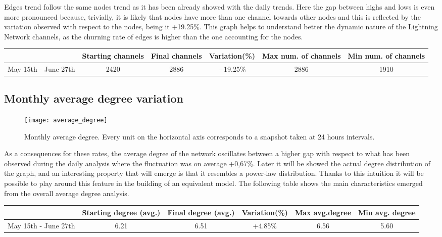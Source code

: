 	Edges trend follow the same nodes trend as it has been already showed with the daily trends. Here the gap between highs and lows is even more pronounced because, trivially, it is likely that nodes have more than one channel towards other nodes and this is reflected by the variation observed with respect to the nodes, being it +19.25\%. This graph helps to understand better the dynamic nature of the Lightning Network channels, as the churning rate of edges is higher than the one accounting for the nodes. 
	
	\begin{center}
		\begin{tabulary}{\linewidth}{| L | C | C | C | C | C |}
			\hline	
			& Starting channels & Final channels  & Variation(\%) & Max num. of channels & Min num. of channels \\ \hline
			May 15th - June 27th & 2420 & 2886 & +19.25\% & 2886 & 1910 \\ \hline
		\end{tabulary}
	\end{center}
	
	\subsection{Monthly average degree variation}
	
	\begin{figure}
		\centering
		\texttt{[image: average\_degree]}
		\caption{Monthly average degree. Every unit on the horizontal axis corresponds to a snapshot taken at 24 hours intervals.}
		\label{monthly_degree}
	\end{figure}
	
	As a consequences for these rates, the average degree of the network oscillates between a higher gap with respect to what has been observed during the daily analysis where the fluctuation was on average +0,67\%. Later it will be showed the actual degree distribution of the graph, and an interesting property that will emerge is that it resembles a power-law distribution. Thanks to this intuition it will be possible to play around this feature in the building of an equivalent model. The following table shows the main characteristics emerged from the overall average degree analysis.
	
	\begin{center}
		\begin{tabulary}{\linewidth}{| L | C | C | C | C | C |}
			\hline	
			& Starting degree (avg.) & Final degree (avg.)  & Variation(\%) & Max avg.degree & Min avg. degree \\ \hline
			May 15th - June 27th & 6.21 & 6.51 & +4.85\% & 6.56 & 5.60 \\ \hline
		\end{tabulary}
	\end{center}
	
